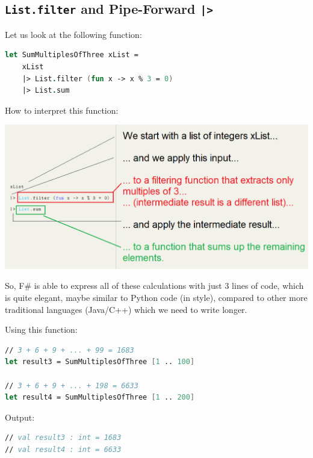 \documentclass[12pt]{article}
\begin{document}
\pagebreak
\subsection{\texttt{List.filter} and Pipe-Forward \texttt{|>}}
Let us look at the following function:
\begin{lstlisting}[language=FSharp]
let SumMultiplesOfThree xList =
    xList
    |> List.filter (fun x -> x % 3 = 0)
    |> List.sum
\end{lstlisting}
How to interpret this function:
\begin{center}
\includegraphics[width=16cm]{pictures/picture26.png}
\end{center}
So, F\# is able to express all of these calculations with just 3 lines of code, which is quite elegant, maybe similar to Python code (in style), compared to other more traditional languages (Java/C++) which we need to write longer.

Using this function:
\begin{lstlisting}[language=FSharp]
// 3 + 6 + 9 + ... + 99 = 1683
let result3 = SumMultiplesOfThree [1 .. 100]

// 3 + 6 + 9 + ... + 198 = 6633
let result4 = SumMultiplesOfThree [1 .. 200]
\end{lstlisting}
Output:
\begin{lstlisting}[language=FSharp]
// val result3 : int = 1683
// val result4 : int = 6633
\end{lstlisting}

\pagebreak
\end{document}
